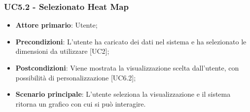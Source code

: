 \subsubsection{UC5.2 - Selezionato Heat Map}
\begin{itemize}
	\item \textbf{Attore primario}: Utente;
	\item \textbf{Precondizioni}: L'utente ha caricato dei dati nel sistema e ha selezionato le dimensioni da utilizzare [UC2];
	\item \textbf{Postcondizioni}: Viene mostrata la visualizzazione  scelta dall'utente, con possibilità di personalizzazione [UC6.2];
	\item \textbf{Scenario principale}: L'utente seleziona la visualizzazione  e il sistema ritorna un grafico con cui si può interagire.

\end{itemize}